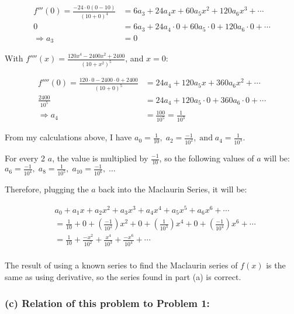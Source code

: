 \documentclass[12pt]{article}
\begin{document}
\begin{align*}
    f'''(0)= \frac{-24\cdot 0\left(0- 10 \right)}{\left(10+ 0 \right)^4}
    &= 6a_3+ 24a_4x+ 60a_5x^2+ 120a_6x^3+ \cdots\\
    0 &= 6a_3+ 24a_4\cdot 0+ 60a_5\cdot 0+ 120a_6\cdot 0+ \cdots\\
    \Longrightarrow a_3 &= 0
\end{align*}


\noindent With $\displaystyle f''''(x)= \frac{120x^4- 2400x^2+ 2400}{\left(10+x^2 \right)^5}$, and $x=0$:

\begin{align*}
    f''''(0)= \frac{120\cdot 0- 2400\cdot 0+ 2400}{\left(10+ 0 \right)^5}
    &= 24a_4+ 120a_5x+ 360a_6x^2+ \cdots\\
    \frac{2400}{10^5} &= 24a_4+ 120a_5\cdot 0+ 360a_6\cdot 0+ \cdots\\
    \Longrightarrow a_4 &= \frac{100}{10^5}= \frac{1}{10^3}
\end{align*}


\noindent From my calculations above, I have $\displaystyle a_0=\frac{1}{10},\; a_2=\frac{-1}{10^2},\; \text{and}\; a_4=\frac{1}{10^3}$.

\noindent For every 2 $a$, the value is multiplied by $\displaystyle \frac{-1}{10}$, so the following values of $a$ will be: $\displaystyle a_6=\frac{-1}{10^4},\; a_8=\frac{1}{10^5},\; a_{10}=\frac{-1}{10^6},\; \dots$

\noindent Therefore, plugging the $a$ back into the Maclaurin Series, it will be:

\begin{align*}
    & a_0+ a_1x+ a_2x^2+ a_3x^3+ a_4x^4+ a_5x^5+ a_6x^6+ \cdots\\
    &= \frac{1}{10}
    + 0
    + \left(\frac{-1}{10^2} \right) x^2
    + 0
    + \left(\frac{1}{10^3} \right) x^4
    + 0
    + \left(\frac{-1}{10^4} \right) x^6
    + \cdots\\
    &= \frac{1}{10}
    + \frac{-x^2}{10^2}
    + \frac{x^4}{10^3}
    + \frac{-x^6}{10^4}
    + \cdots\\
\end{align*}

\noindent The result of using a known series to find the Maclaurin series of $f(x)$ is the same as using derivative, so the series found in part (a) is correct.


\subsubsection*{(c) Relation of this problem to Problem 1:}
\end{document}
